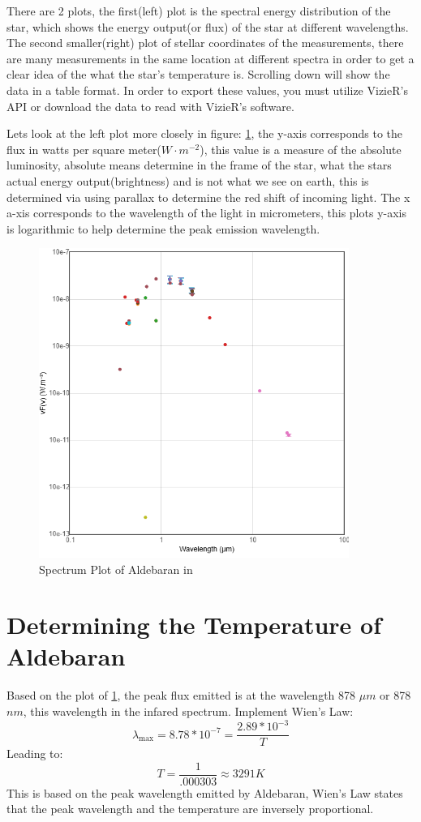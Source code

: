 \documentclass[12pt,oneside,a4paper,english]{article}
\begin{document}
There are 2 plots, the first(left) plot is the spectral energy distribution of the star, which shows the energy output(or flux) of the star at different wavelengths. The second smaller(right) plot of stellar coordinates of the measurements, there are many measurements in the same location at different spectra in order to get a clear idea of the what the star's temperature is. Scrolling down will show the data in a table format. In order to export these values, you must utilize VizieR's API or download the data to read with VizieR's software.

Lets look at the left plot more closely in figure: \ref{fig:vizier2}, the y-axis corresponds to the flux in watts per square meter($W \cdot m^{-2}$), this value is a measure of the absolute luminosity, absolute means determine in the frame of the star, what the stars actual energy output(brightness) and is not what we see on earth, this is determined via using parallax to determine the red shift of incoming light. The x a-xis corresponds to the wavelength of the light in micrometers, this plots y-axis is logarithmic to help determine the peak emission wavelength.
\begin{figure}[H]
    \centering
    \includegraphics[width=0.9\textwidth]{VizieR2.png}
    \caption{Spectrum Plot of Aldebaran in \cite{vizier}}
    \label{fig:vizier2}
\end{figure}
\section{Determining the Temperature of Aldebaran}
Based on the plot of \ref{fig:vizier2}, the peak flux emitted is at the wavelength 878 $\mu m$ or 878 $nm$, this wavelength in the infared spectrum. Implement Wien's Law:
$$
\lambda_{\text{max}} = 8.78*10^{-7} = \frac{2.89*10^{-3}}{T}
$$
Leading to:
$$
T = \frac{1}{.000303} \approx 3291 K
$$
This is based on the peak wavelength emitted by Aldebaran, Wien's Law states that the peak wavelength and the temperature are inversely proportional.
\end{document}
